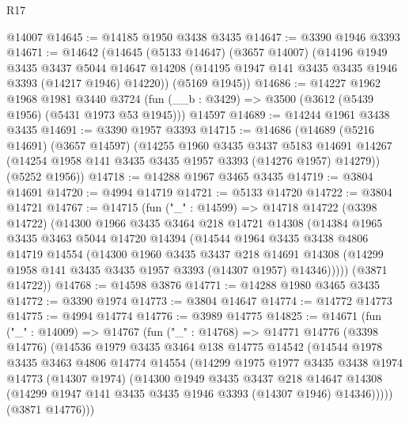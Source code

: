\begin{lexlean}{R17}
\begin{coremodule}
    @14007
@14645 := @14185 @1950 @3438 @3435
@14647 := @3390 @1946 @3393
@14671 := @14642
    (@14645
      (@5133 @14647)
      (@3657 @14007)
      (@14196
        @1949
        @3435
        @3437
        @5044
        @14647
        @14208
        (@14195 @1947 @141 @3435 @3435 @1946 @3393 (@14217 @1946) @14220))
      (@5169 @1945))
@14686 := @14227
    @1962
    @1968
    @1981
    @3440
    @3724
    (fun (__b : @3429) => @3500 (@3612 (@5439 @1956) (@5431 @1973 @53 @1945)))
    @14597
@14689 := @14244 @1961 @3438 @3435
@14691 := @3390 @1957 @3393
@14715 := @14686
    (@14689
      (@5216 @14691)
      (@3657 @14597)
      (@14255
        @1960
        @3435
        @3437
        @5183
        @14691
        @14267
        (@14254 @1958 @141 @3435 @3435 @1957 @3393 (@14276 @1957) @14279))
      (@5252 @1956))
@14718 := @14288 @1967 @3465 @3435
@14719 := @3804 @14691
@14720 := @4994 @14719
@14721 := @5133 @14720
@14722 := @3804 @14721
@14767 := @14715
    (fun ("_" : @14599) =>
    @14718
      @14722
      (@3398 @14722)
      (@14300
        @1966
        @3435
        @3464
        @218
        @14721
        @14308
        (@14384
          @1965
          @3435
          @3463
          @5044
          @14720
          @14394
          (@14544
            @1964
            @3435
            @3438
            @4806
            @14719
            @14554
            (@14300
              @1960
              @3435
              @3437
              @218
              @14691
              @14308
              (@14299 @1958 @141 @3435 @3435 @1957 @3393 (@14307 @1957) @14346)))))
      (@3871 @14722))
@14768 := @14598 @3876
@14771 := @14288 @1980 @3465 @3435
@14772 := @3390 @1974
@14773 := @3804 @14647
@14774 := @14772 @14773
@14775 := @4994 @14774
@14776 := @3989 @14775
@14825 := @14671
    (fun ("_" : @14009) =>
    @14767
      (fun ("_" : @14768) =>
      @14771
        @14776
        (@3398 @14776)
        (@14536
          @1979
          @3435
          @3464
          @138
          @14775
          @14542
          (@14544
            @1978
            @3435
            @3463
            @4806
            @14774
            @14554
            (@14299
              @1975
              @1977
              @3435
              @3438
              @1974
              @14773
              (@14307 @1974)
              (@14300
                @1949
                @3435
                @3437
                @218
                @14647
                @14308
                (@14299 @1947 @141 @3435 @3435 @1946 @3393 (@14307 @1946) @14346)))))
        (@3871 @14776)))

\end{coremodule}
\end{lexlean}
